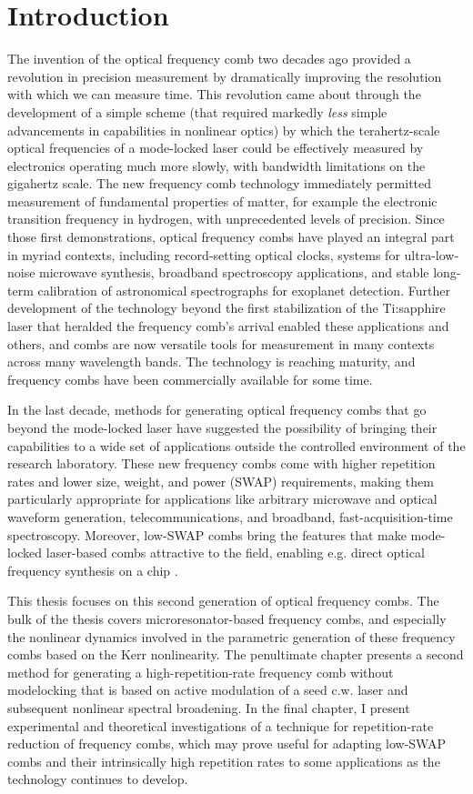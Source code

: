  \chapter{Introduction}
\label{ch:intro}

The invention of the optical frequency comb two decades ago provided a revolution in precision measurement by dramatically improving the resolution with which we can measure time. This revolution came about through the development of a simple scheme (that required markedly \textit{less} simple advancements in capabilities in nonlinear optics) by which the terahertz-scale optical frequencies of a mode-locked laser could be effectively measured by electronics operating much more slowly, with bandwidth limitations on the gigahertz scale. The new frequency comb technology immediately permitted measurement of fundamental properties of matter, for example the electronic transition frequency in hydrogen, with unprecedented levels of precision. Since those first demonstrations, optical frequency combs have played an integral part in myriad contexts, including record-setting optical clocks, systems for ultra-low-noise microwave synthesis, broadband spectroscopy applications, and stable long-term calibration of astronomical spectrographs for exoplanet detection. Further development of the technology beyond the first stabilization of the Ti:sapphire laser that heralded the frequency comb's arrival enabled these applications and others, and combs are now versatile tools for measurement in many contexts across many wavelength bands. The technology is reaching maturity, and frequency combs have been commercially available for some time.

In the last decade, methods for generating optical frequency combs that go beyond the mode-locked laser have suggested the possibility of bringing their capabilities to a wide set of applications outside the controlled environment of the research laboratory. These new frequency combs come with higher repetition rates and lower size, weight, and power (SWAP) requirements, making them particularly appropriate for applications like arbitrary microwave and optical waveform generation, telecommunications, and broadband, fast-acquisition-time spectroscopy. Moreover, low-SWAP combs bring the features that make mode-locked laser-based combs attractive to the field, enabling e.g. direct optical frequency synthesis on a chip \cite{Spencer2018}.

This thesis focuses on this second generation of optical frequency combs. The bulk of the thesis covers microresonator-based frequency combs, and especially the nonlinear dynamics involved in the parametric generation of these frequency combs based on the Kerr nonlinearity. The penultimate chapter presents a second method for generating a high-repetition-rate frequency comb without modelocking that is based on active modulation of a seed c.w. laser and subsequent nonlinear spectral broadening. In the final chapter, I present experimental and theoretical investigations of a technique for repetition-rate reduction of frequency combs, which may prove useful for adapting low-SWAP combs and their intrinsically high repetition rates to some applications as the technology continues to develop.

